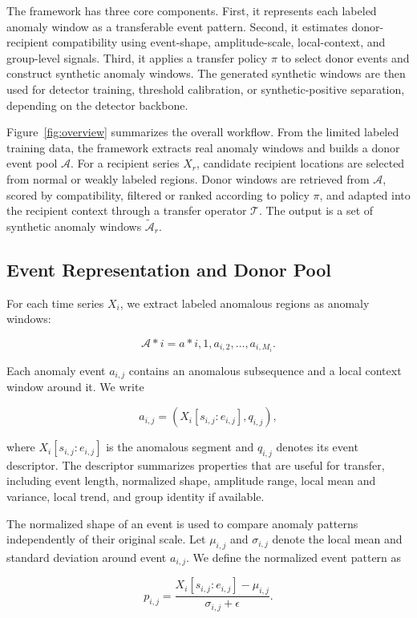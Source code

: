 \documentclass[conference]{IEEEtran}
\begin{document}
The framework has three core components. First, it represents each labeled anomaly window as a transferable event pattern. Second, it estimates donor-recipient compatibility using event-shape, amplitude-scale, local-context, and group-level signals. Third, it applies a transfer policy $\pi$ to select donor events and construct synthetic anomaly windows. The generated synthetic windows are then used for detector training, threshold calibration, or synthetic-positive separation, depending on the detector backbone.

Figure~\ref{fig:overview} summarizes the overall workflow. From the limited labeled training data, the framework extracts real anomaly windows and builds a donor event pool $\mathcal{A}$. For a recipient series $X_r$, candidate recipient locations are selected from normal or weakly labeled regions. Donor windows are retrieved from $\mathcal{A}$, scored by compatibility, filtered or ranked according to policy $\pi$, and adapted into the recipient context through a transfer operator $\mathcal{T}$. The output is a set of synthetic anomaly windows $\widetilde{\mathcal{A}}_r$.

\subsection{Event Representation and Donor Pool}
For each time series $X_i$, we extract labeled anomalous regions as anomaly windows:

\[
\mathcal{A}*i={a*{i,1},a_{i,2},\ldots,a_{i,M_i}}.
\]

Each anomaly event $a_{i,j}$ contains an anomalous subsequence and a local context window around it. We write

\[
a_{i,j}=(X_i[s_{i,j}:e_{i,j}], q_{i,j}),
\]

where $X_i[s_{i,j}:e_{i,j}]$ is the anomalous segment and $q_{i,j}$ denotes its event descriptor. The descriptor summarizes properties that are useful for transfer, including event length, normalized shape, amplitude range, local mean and variance, local trend, and group identity if available.

The normalized shape of an event is used to compare anomaly patterns independently of their original scale. Let $\mu_{i,j}$ and $\sigma_{i,j}$ denote the local mean and standard deviation around event $a_{i,j}$. We define the normalized event pattern as

\[
p_{i,j}
=
\frac{X_i[s_{i,j}:e_{i,j}]-\mu_{i,j}}
{\sigma_{i,j}+\epsilon}.
\]
\end{document}
